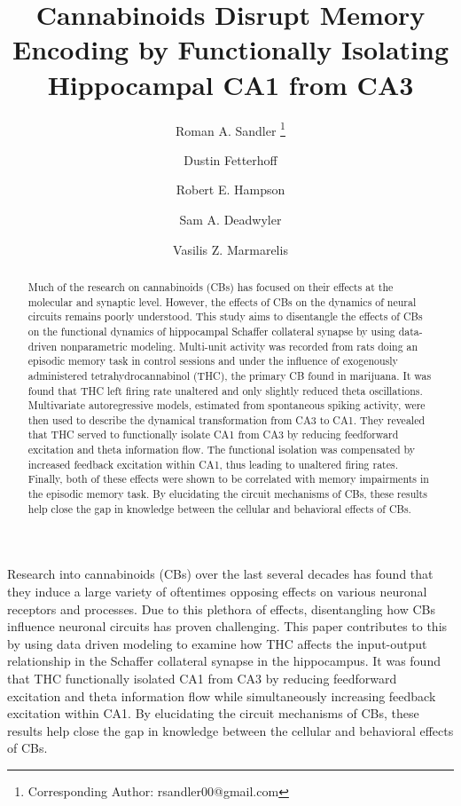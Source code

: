 \documentclass[11pt,a4paper,final]{article}
\title{\vspace{-30mm}\fontsize{14pt}{1pt}\textbf{Cannabinoids Disrupt Memory Encoding by Functionally Isolating Hippocampal CA1 from CA3}} %
\author[1]{Roman A. Sandler     \thanks{Corresponding Author: rsandler00@gmail.com}}
\author[2]{Dustin Fetterhoff    }   %
\author[2]{Robert E. Hampson    }	%
\author[2]{Sam A. Deadwyler     }	%
\author[1]{Vasilis Z. Marmarelis}
\affil[1]{Department of Biomedical Engineering, University of Southern California, Los Angeles, CA, USA}
\affil[2]{Department of Physiology \& Pharmacology, Wake Forest University, Winston-Salem, NC, USA}
\begin{document}
\maketitle %

\begin{abstract}
Much of the research on cannabinoids (CBs) has focused on their effects at the molecular and synaptic level.
However, the effects of CBs on the dynamics of neural circuits remains poorly understood.
This study aims to disentangle the effects of CBs on the functional dynamics of hippocampal Schaffer collateral synapse by using data-driven nonparametric modeling.
Multi-unit activity was recorded from rats doing an episodic memory task in control sessions and under the influence of exogenously administered tetrahydrocannabinol (THC), the primary CB found in marijuana.
It was found that THC left firing rate unaltered and only slightly reduced theta oscillations.
Multivariate autoregressive models, estimated from spontaneous spiking activity, were then used to describe the dynamical transformation from CA3 to CA1.
They revealed that THC served to functionally isolate CA1 from CA3 by reducing feedforward excitation and theta information flow.
The functional isolation was compensated by increased feedback excitation within CA1, thus leading to unaltered firing rates.
Finally, both of these effects were shown to be correlated with memory impairments in the episodic memory task.
By elucidating the circuit mechanisms of CBs, these results help close the gap in knowledge between the cellular and behavioral effects of CBs.
\end{abstract}

\section*{}
Research into cannabinoids (CBs) over the last several decades has found that they induce a large variety of oftentimes opposing effects on various neuronal receptors and processes.
Due to this plethora of effects, disentangling how CBs influence neuronal circuits has proven challenging.
This paper contributes to this by using data driven modeling to examine how THC affects the input-output relationship in the Schaffer collateral synapse in the hippocampus.
It was found that THC functionally isolated CA1 from CA3 by reducing feedforward excitation and theta information flow while simultaneously increasing feedback excitation within CA1.
By elucidating the circuit mechanisms of CBs, these results help close the gap in knowledge between the cellular and behavioral effects of CBs.
\end{document}
